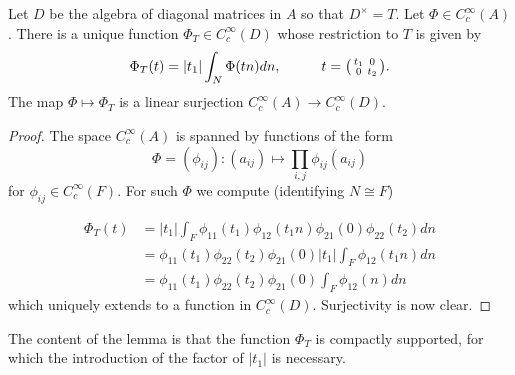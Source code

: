 \begin{lemma}\label{lemma:phiT}
    Let $D$ be the algebra of diagonal matrices in $A$ so that $D^\times =T$. Let $\Phi \in C_c^\infty(A)$. There is a unique function $\Phi_T \in C_c^\infty(D)$ whose restriction to $T$ is given by 
    $$\Phi_T(t) = |t_1| \int_N \Phi(tn)dn, \hspace{1cm} t=\begin{psmallmatrix}
        t_1 & 0\\0&t_2
    \end{psmallmatrix}.$$
    The map $\Phi \mapsto \Phi_T$ is a linear surjection $C_c^\infty(A) \to C_c^\infty (D)$.
\end{lemma}
\begin{proof}
    The space $C_c^\infty(A)$ is spanned by functions of the form 
    $$\Phi = (\phi_{ij}): (a_{ij}) \mapsto \prod\limits_{i,j} \phi_{ij}(a_{ij})$$
    for $\phi_{ij} \in C_c^\infty (F)$. For such $\Phi$ we compute (identifying $N \cong F$)
    
    \begin{equation*}
        \begin{split}
            \Phi_T(t) &= |t_1| \int_F \phi_{11}(t_1)\phi_{12}(t_1n)\phi_{21}(0)\phi_{22}(t_2)dn \\
            &= \phi_{11}(t_1)\phi_{22}(t_2)\phi_{21}(0) |t_1|\int_F \phi_{12}(t_1n) dn \\
            &= \phi_{11}(t_1)\phi_{22}(t_2)\phi_{21}(0) \int_F \phi_{12}(n) dn
        \end{split}
    \end{equation*}
    which uniquely extends to a function in $C_c^\infty(D)$. Surjectivity is now clear.
\end{proof}
\begin{rem}
    The content of the lemma is that the function $\Phi_T$ is compactly supported, for which the introduction of the factor of $|t_1|$ is necessary.
\end{rem}

